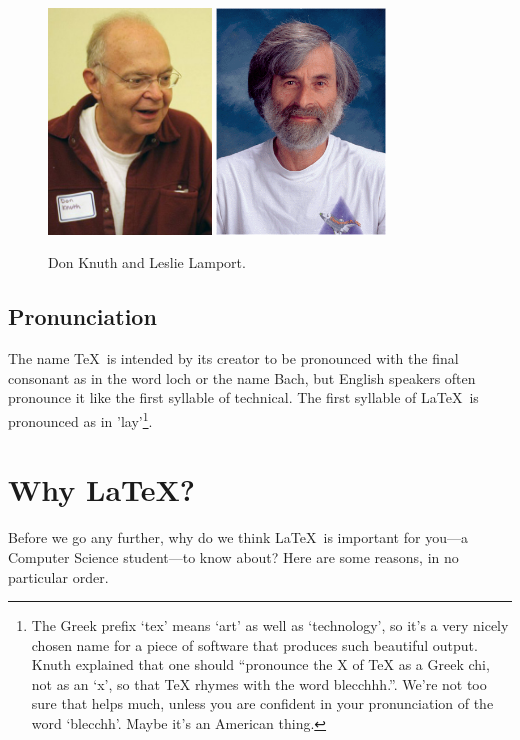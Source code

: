 \begin{refsection}
\begin{figure}[hb]
  \centering
     \includegraphics[height=6cm]{images/knuth.png}
\quad\quad  \includegraphics[height=6cm]{images/lamport.png}
\caption{Don Knuth and Leslie Lamport.}\label{figure:knuthlamport}
\end{figure}

\subsection{Pronunciation}
\label{sec:pronunciation}
  The name \TeX\ is intended by its creator to be pronounced with the final consonant as in the word loch or the name Bach, but English speakers often pronounce it like the first syllable of technical. The first syllable of \LaTeX\ is pronounced as in 'lay'\footnote{The Greek prefix `tex' means `art' as well as `technology', so it's a very nicely chosen name for a piece of software that produces such beautiful output. Knuth explained \citep{knuth1984} that one should ``pronounce the X of TeX as a Greek chi, not as an `x', so that TeX rhymes with the word blecchhh.''. We're not too sure that helps much, unless you are confident in your pronunciation of the word `blecchh'. Maybe it's an American thing.}.


\section{Why \LaTeX?}
\label{sec:why}
 Before we go any further, why do we think \LaTeX\ is important for you---a Computer Science student---to know about? Here are some reasons, in no particular order.


\end{refsection}
